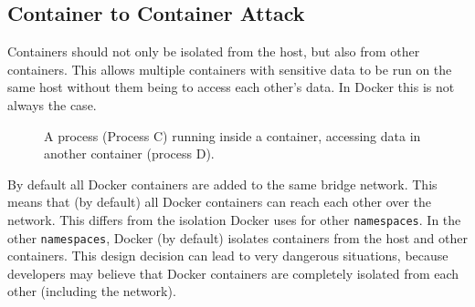 \subsection{Container to Container Attack}
Containers should not only be isolated from the host, but also from other containers. This allows multiple containers with sensitive data to be run on the same host without them being to access each other's data. In Docker this is not always the case.

\begin{figure}[ht]
    \centering
    \caption{}\label{fig:container-to-container-attack}
    \medskip
    \small
    A process (Process C) running inside a container, accessing data in another container (process D).
\end{figure}

By default all Docker containers are added to the same bridge network. This means that (by default) all Docker containers can reach each other over the network. This differs from the isolation Docker uses for other \lstinline{namespaces}. In the other \lstinline{namespaces}, Docker (by default) isolates containers from the host and other containers. This design decision can lead to very dangerous situations, because developers may believe that Docker containers are completely isolated from each other (including the network).
